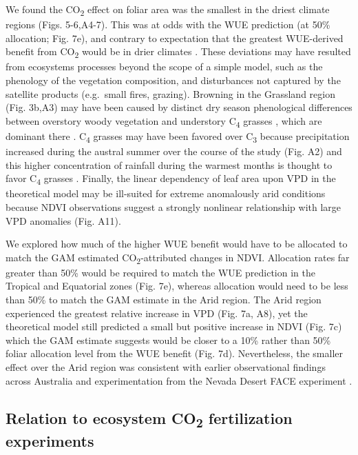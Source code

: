 \documentclass[gc, manuscript]{copernicus}
\begin{document}
We found the CO\textsubscript{2} effect on foliar area was the smallest
in the driest climate regions (Figs. 5-6,A4-7). This was at odds with
the WUE prediction (at 50\% allocation; Fig. 7e), and contrary to
expectation that the greatest WUE-derived benefit from
CO\textsubscript{2} would be in drier climates
\citep{donohue_etal17, mcmurtrieWhyPlantgrowthResponse2008}. These
deviations may have resulted from ecosystems processes beyond the scope
of a simple model, such as the phenology of the vegetation composition,
and disturbances not captured by the satellite products (e.g.~small
fires, grazing). Browning in the Grassland region (Fig. 3b,A3) may have
been caused by distinct dry season phenological differences between
overstory woody vegetation and understory C\textsubscript{4} grasses
\citep{mooreReviewsSynthesesAustralian2016}, which are dominant there
\citep{murphySeasonalWaterAvailability2007}. C\textsubscript{4} grasses
may have been favored over C\textsubscript{3} because precipitation
increased during the austral summer over the course of the study (Fig.
A2) and this higher concentration of rainfall during the warmest months
is thought to favor C\textsubscript{4} grasses
\citep{hattersleyDistributionC3C41983a, knappResolvingDustBowl2020, murphySeasonalWaterAvailability2007}.
Finally, the linear dependency of leaf area upon VPD in the theoretical
model may be ill-suited for extreme anomalously arid conditions because
NDVI observations suggest a strongly nonlinear relationship with large
VPD anomalies (Fig. A11).

We explored how much of the higher WUE benefit would have to be
allocated to match the GAM estimated CO\textsubscript{2}-attributed
changes in NDVI. Allocation rates far greater than 50\% would be
required to match the WUE prediction in the Tropical and Equatorial
zones (Fig. 7e), whereas allocation would need to be less than 50\% to
match the GAM estimate in the Arid region. The Arid region experienced
the greatest relative increase in VPD (Fig. 7a, A8), yet the theoretical
model still predicted a small but positive increase in NDVI (Fig. 7c)
which the GAM estimate suggests would be closer to a 10\% rather than
50\% foliar allocation level from the WUE benefit (Fig. 7d).
Nevertheless, the smaller effect over the Arid region was consistent
with earlier observational findings across Australia
\citep{ukkolaReducedStreamflowWaterstressed2016b} and experimentation
from the Nevada Desert FACE experiment
\citep{smithLongtermResponseMojave2014}.

\subsection{\texorpdfstring{Relation to ecosystem CO\textsubscript{2}
fertilization
experiments}{Relation to ecosystem CO2 fertilization experiments}}
\end{document}
